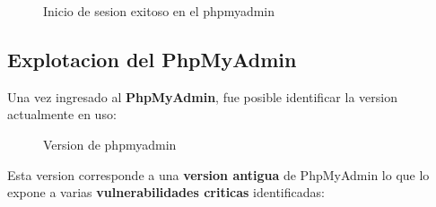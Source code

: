 \documentclass[a4paper]{article} %
\begin{document}
  \begin{figure}[h]

    \centering
    \setlength{\fboxrule}{0.8pt}
      \caption{Inicio de sesion exitoso en el phpmyadmin}
  \end{figure}
  \clearpage

  \subsection{Explotacion del PhpMyAdmin}
  Una vez ingresado al \textbf{PhpMyAdmin}, fue posible identificar la version actualmente en uso:

  \vspace{0.3cm}

  \begin{figure}[h]

    \centering
    \setlength{\fboxrule}{0.8pt}
      \caption{Version de phpmyadmin}
  \end{figure}

  Esta version corresponde a una \textbf{version antigua} de PhpMyAdmin lo que lo expone a varias \textbf{vulnerabilidades criticas} identificadas:
\end{document}
